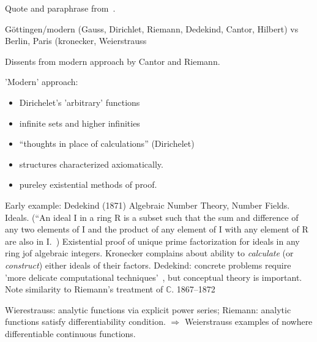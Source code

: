 \setcounter{currentlevel}{\value{baseSectionLevel}}
\label{sec:Foundations_of_mathematics}

\label{sec:Crisis-1870--1930}


\label{sec:Ferreiros_Crisis}

Quote and paraphrase from~\cite{Ferreiros2008-FERTCI}.

G\"{o}ttingen/modern 
(Gauss, Dirichlet, Riemann, Dedekind, Cantor, Hilbert)
vs
Berlin, Paris (kronecker, Weierstrauss

Dissents from modern approach by Cantor and Riemann.

'Modern' approach:
\begin{itemize}
\item Dirichelet's 'arbitrary' functions
\item infinite sets and higher infinities
\item ``thoughts in place of calculations'' (Dirichelet)
\item structures characterized axiomatically.
\item pureley existential methods of proof.
\end{itemize}

Early example: Dedekind (1871) Algebraic Number Theory,
Number Fields. Ideals.
 (``An ideal I in a ring R is a subset 
 such that the sum and difference of any two elements of I 
 and the product of any element of I with any element of R 
 are also in I.~\cite{sep-dedekind-foundations})
Existential proof of unique prime factorization for
ideals in any ring jof algebraic integers.
Kronecker complains about ability to \textsl{calculate}
(or \textsl{construct})
either ideals of their factors.
Dedekind: concrete problems require 
'more delicate computational 
techniques'~\cite{Ferreiros2008-FERTCI},
but conceptual theory is important.
Note similarity to Riemann's treatment of $\mathbb{C}$.
1867--1872

Wierestrauss: analytic functions via explicit power series;
Riemann: analytic functions satisfy differentiability condition.
$\Rightarrow$ Weierstrauss examples of nowhere differentiable
continuous functions.

